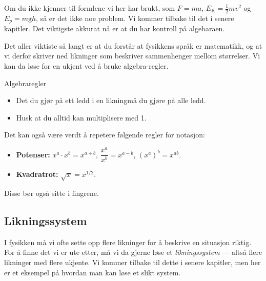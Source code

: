 \begin{mymerk*}{}
Om du ikke kjenner til formlene vi her har brukt, som $F=ma$, $E_\text{K} = \frac{1}{2}mv^2$ og $E_p = m\mathrm{g}h$, så er det ikke noe problem. Vi kommer tilbake til det i senere kapitler. Det viktigste akkurat nå er at du har kontroll på algebaraen.
\end{mymerk*}
Det aller viktiste så langt er at du forstår at fysikkens språk er matematikk, og at vi derfor skriver ned likninger som beskriver sammenhenger mellom størrelser. Vi kan da løse for en ukjent ved å bruke algebra-regler.
\begin{myoppsum*}{Algebraregler}
    \begin{itemize}
        \item Det du gjør på ett ledd i en likningmå du gjøre på alle ledd.
        \item Husk at du alltid kan multiplisere med 1.
    \end{itemize}
\end{myoppsum*}
Det kan også være verdt å repetere følgende regler for notasjon:
\begin{itemize}
    \item \textbf{Potenser:} $x^a \cdot x^b = x^{a+b}$, \quad $\dfrac{x^a}{x^b} = x^{a-b}$, \quad $(x^a)^b = x^{ab}$.
    \item \textbf{Kvadratrot:} $\sqrt{x} = x^{1/2}$.
\end{itemize}
Disse bør også sitte i fingrene.

\subsection{Likningssystem}
I fysikken må vi ofte sette opp flere likninger for å beskrive en situasjon riktig. For å finne det vi er ute etter, må vi da gjerne løse et \emph{likningssystem} — altså flere likninger med flere ukjente. Vi kommer tilbake til dette i senere kapitler, men her er et eksempel på hvordan man kan løse et slikt system.



